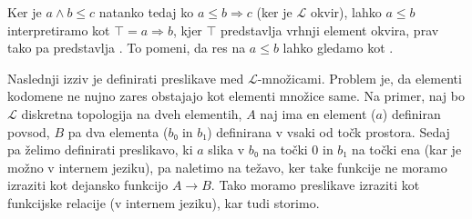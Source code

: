 Ker je \(a∧b ≤ c\) natanko tedaj ko \(a ≤ b⇒c\) (ker je \(ℒ\) okvir),
lahko \(a ≤ b\) interpretiramo kot \(⊤ = a⇒b\), kjer \(⊤\) predstavlja vrhnji
element okvira, prav tako pa predstavlja .
To pomeni, da res na \(a ≤ b\) lahko gledamo kot .

Naslednji izziv je definirati preslikave med \(ℒ\)-množicami.
Problem je, da elementi kodomene ne nujno zares obstajajo kot elementi množice
same. Na primer, naj bo \(ℒ\) diskretna topologija na dveh elementih, \(A\) naj
ima en element (\(a\)) definiran povsod, \(B\) pa dva elementa (\(b₀\) in
\(b₁\)) definirana v vsaki od točk prostora. Sedaj pa želimo definirati
preslikavo, ki \(a\) slika v \(b₀\) na točki \(0\) in \(b₁\) na točki ena (kar
je možno v internem jeziku), pa naletimo na težavo, ker take funkcije ne moramo
izraziti kot dejansko funkcijo \(A → B\). Tako moramo preslikave izraziti kot
funkcijske relacije (v internem jeziku), kar tudi storimo.




